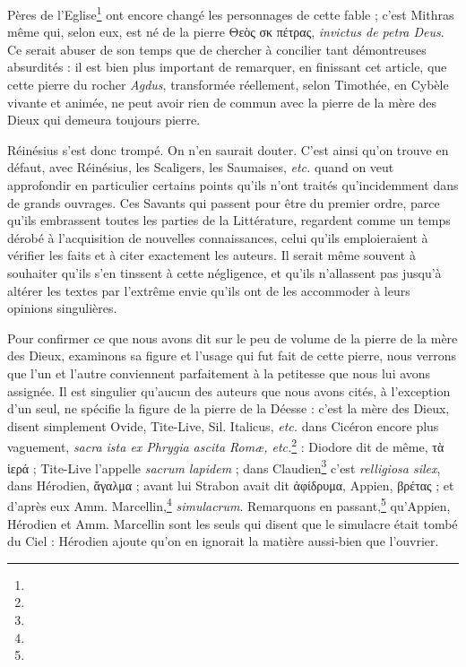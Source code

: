 \documentclass[a4paper, 11pt, oneside, polutonikogreek, french]{article}
\begin{document}
Pères de l'Eglise\footnote{} ont encore changé les personnages de cette fable ; c'est Mithras même qui, selon eux, est né de la pierre Θεὸς σκ πέτρας, \emph{invictus de petra Deus}. Ce serait abuser de son temps que de chercher à concilier tant démontreuses absurdités : il est bien plus important de remarquer, en finissant cet article, que cette pierre du rocher \emph{Agdus}, transformée réellement, selon Timothée, en Cybèle vivante et animée, ne peut avoir rien de commun avec la pierre de la mère des Dieux qui demeura toujours pierre.

Réinésius s'est donc trompé. On n'en saurait douter. C'est ainsi qu'on trouve en défaut, avec Réinésius, les Scaligers, les Saumaises, \emph{etc.} quand on veut approfondir en particulier certains points qu'ils n'ont traités qu'incidemment dans de grands ouvrages. Ces Savants qui passent pour être du premier ordre, parce qu'ils embrassent toutes les parties de la Littérature, regardent comme un temps dérobé à l'acquisition de nouvelles connaissances, celui qu'ils emploieraient à vérifier les faits et à citer exactement les auteurs. Il serait même souvent à souhaiter qu'ils s'en tinssent à cette négligence, et qu'ils n'allassent pas jusqu'à altérer les textes par l'extrême envie qu'ils ont de les accommoder à leurs opinions singulières.

Pour confirmer ce que nous avons dit sur le peu de volume de la pierre de la mère des Dieux, examinons sa figure et l'usage qui fut fait de cette pierre, nous verrons que l'un et l'autre conviennent parfaitement à la petitesse que nous lui avons assignée. Il est singulier qu'aucun des auteurs que nous avons cités, à l'exception d'un seul, ne spécifie la figure de la pierre de la Déesse : c'est la mère des Dieux, disent simplement Ovide, Tite-Live, Sil. Italicus, \emph{etc.} dans Cicéron encore plus vaguement, \emph{sacra ista ex Phrygia ascita Romæ, etc.}\footnote{} : Diodore dit de même, τὰ ἱερά ; Tite-Live l'appelle \emph{sacrum lapidem} ; dans Claudien\footnote{} c'est \emph{relligiosa silex}, dans Hérodien, ἄγαλμα ; avant lui Strabon avait dit ἀφίδρυμα, Appien, βρέτας ; et d'après eux Amm. Marcellin,\footnote{} \emph{simulacrum}. Remarquons en passant,\footnote{} qu'Appien, Hérodien et Amm. Marcellin sont les seuls qui disent que le simulacre était tombé du Ciel : Hérodien ajoute qu'on en ignorait la matière aussi-bien que l'ouvrier.
\end{document}
